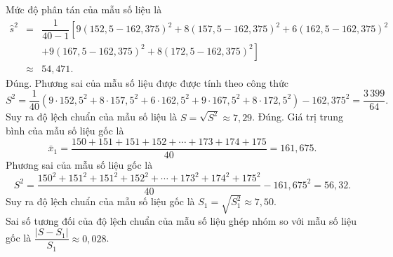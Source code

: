 \begin{ex}
{\begin{itemchoice}
			Mức độ phân tán của mẫu số liệu là 
			\begin{eqnarray*}
				\widehat{s}^2&=&\dfrac{1}{40-1}\left[9(152{,}5-162{,}375)^2+8(157{,}5-162{,}375)^2+6(162{,}5-162{,}375)^2\right.\\&&\left.+9(167{,}5-162{,}375)^2+8(172{,}5-162{,}375)^2\right]\\
				&\approx&54{,}471.
			\end{eqnarray*}
			\itemch Đúng. Phương sai của mẫu số liệu được được tính theo công thức
			$$S^2=\dfrac{1}{40}\left(9\cdot152{,}5^2+8\cdot157{,}5^2+6\cdot162{,}5^2+9\cdot167{,}5^2+8\cdot172{,}5^2\right)-162{,}375^2=\dfrac{3\,399}{64}.$$
			Suy ra độ lệch chuẩn của mẫu số liệu là $S=\sqrt{S^2}\approx 7{,}29$.
			\itemch Đúng. Giá trị trung bình của mẫu số liệu gốc là$$\bar{x}_1=\dfrac{150+151+151+152+\cdots+173+174+175}{40}=161{,}675.$$
			Phương sai của mẫu số liệu gốc là$$S^2=\dfrac{150^2+151^2+151^2+152^2+\cdots+173^2+174^2+175^2}{40}-161{,}675^2=56{,}32.$$
			Suy ra độ lệch chuẩn của mẫu số liệu gốc là $S_1=\sqrt{S_1^2}\approx 7{,}50$.\\
			Sai số tương đối của độ lệch chuẩn của mẫu số liệu ghép nhóm so với mẫu số liệu gốc là $\dfrac{|S-S_1|}{S_1}\approx0{,}028$.
		\end{itemchoice}
	}
\end{ex}

